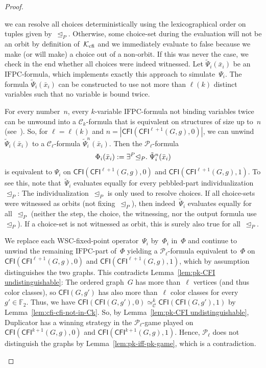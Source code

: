 \documentclass[]{lmcs}
\newcommand{\FF}{\mathbb{F}}
\newcommand{\qspace}{\mathchoice{\;}{\,}{}{}}
\newcommand{\formA}{\Phi}
\newcommand{\formB}{\Psi}
\newcommand{\tup}[1]{\bar{#1}}
\newcommand{\IFPC}{\ensuremath{\mathrm{IFPC}}}
\newcommand{\Ck}[1]{\mathcal{C}_{#1}}
\newcommand{\CFImk}[2]{\mathsf{CFI}^{#1}(#2)}
\newcommand{\CFIsym}{\mathsf{CFI}}
\newcommand{\CFI}[1]{\CFIsym(#1)}
\newcommand{\kequiv}[1]{\simeq^#1_{\mathcal{C}}}
\newcommand{\indRel}{\trianglelefteq}
\newcommand{\Pk}[1]{\mathcal{P}_{#1}}
\newcommand{\existsP}[1]{\exists^P{#1}}
\newenvironment{claimproof}[1][\proofname]{\begin{claimprooftemp}[#1]\renewcommand*{\qedsymbol}{\(\dashv\)}}{\end{claimprooftemp}}
\begin{document}
\begin{proof}
\begin{claimproof}
		we can resolve all choices deterministically using
		the lexicographical order on tuples given by~$\indRel_P$.
		Otherwise, some choice-set during the evaluation
		will not be an orbit by definition of~$\mathcal{K}_{\text{cfi}}$
		and
		we immediately evaluate to false
		because we make (or will make) a choice out of a non-orbit.
		If this was never the case,
		we check in the end whether all choices were indeed witnessed.
		Let $\tilde{\formB}_{i}(\tup{x}_i)$ be an \IFPC{}-formula,
		which implements exactly this approach to simulate~$\formB_i$.
		The formula  $\tilde{\formB}_{i}(\tup{x}_i)$ can be constructed to use not more than $\ell(k)$ distinct variables
		such that no variable is bound twice.
		
		For every number~$n$,
		every $k$-variable \IFPC{}-formula not binding variables twice can be unwound into
		a $\Ck{k}$-formula that is equivalent on structures of size up to~$n$ (see~\cite{Otto1997}).
		So, for $\ell = \ell(k)$ and $n=|\CFI{\CFImk{\ell+1}{G,g},0}|$,
		we can unwind $\tilde{\formB}_{i}(\tup{x}_i)$ to a  $\Ck{\ell}$-formula $\tilde{\formB}_{i}^n(\tup{x}_i)$.
		Then the $\Pk{\ell}$-formula
		\[\formA_i(\tup{x}_i):= \existsP{\indRel_P}.\qspace\tilde{\formB}_{i}^n(\tup{x}_i)\]
		is equivalent to $\formB_i$ on $\CFI{\CFImk{\ell+1}{G,g},0}$ and $\CFI{\CFImk{\ell+1}{G,g},1}$.
		To see this, note that~$\tilde{\formB}_{i}$ evaluates equally for every pebbled-part individualization $\indRel_P$:
		The individualization~$\indRel_P$ is only used to resolve choices.		
		If all choice-sets were witnessed as orbits (not fixing~$\indRel_P$),
		then indeed~$\tilde{\formB}_{i}$ evaluates equally for all~$\indRel_P$ (neither the step, the choice, the witnessing, nor the output formula  use~$\indRel_P$).
		If a choice-set is not witnessed as orbit, this is surely also true for all~$\indRel_P$.
	
		We replace each WSC-fixed-point operator~$\formB_i$ by~$\formA_i$ in~$\formA$
		and continue to unwind the remaining \IFPC{}-part of~$\formA$
		yielding a $\Pk{\ell}$-formula equivalent to~$\formA$
		on $\CFI{\CFImk{\ell+1}{G,g},0}$ and $\CFI{\CFImk{\ell+1}{G,g},1}$,
		which by assumption distinguishes the two graphs.
		This contradicts Lemma~\ref{lem:pk-CFI undistinguishable}:
		The ordered graph~$G$ has more than~$\ell$ vertices (and thus color classes),
		so $\CFI{G,g'}$ has also more than~$\ell$ color classes for every $g' \in \FF_2$.
		Thus, we have
		$\CFI{\CFI{G,g'},0} \kequiv{k} \CFI{\CFI{G,g'},1}$ by Lemma~\ref{lem:cfi-cfi-not-in-Ck}.
		So, by  Lemma~\ref{lem:pk-CFI undistinguishable},
		Duplicator has a winning strategy in the $\Pk{\ell}$-game
		played on $\CFI{\CFImk{k+1}{G,g},0}$ and $\CFI{\CFImk{k+1}{G,g},1}$.
		Hence, $\Pk{\ell}$ does not distinguish the graphs
		by Lemma~\ref{lem:pk-iff-pk-game}, which is a contradiction.
	\end{claimproof}


\end{proof}
\end{document}

